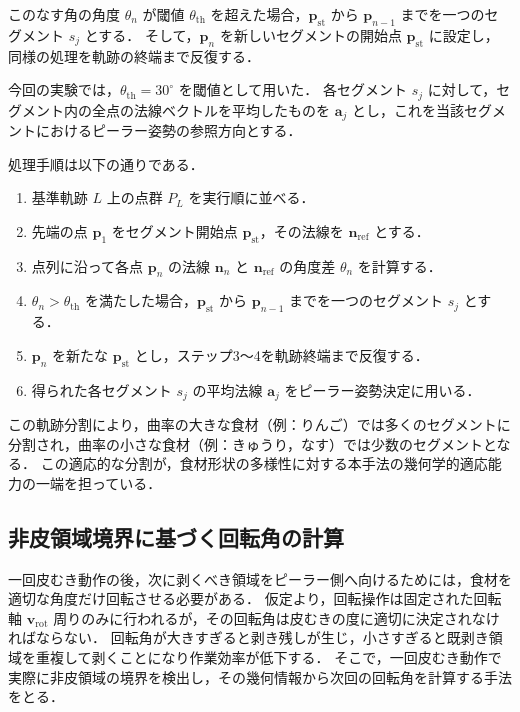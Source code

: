 
このなす角の角度 $\theta_n$ が閾値 $\theta_{\mathrm{th}}$ を超えた場合，$\mathbf{p}_{\mathrm{st}}$ から $\mathbf{p}_{n-1}$ までを一つのセグメント $s_j$ とする．
そして，$\mathbf{p}_n$ を新しいセグメントの開始点 $\mathbf{p}_{\mathrm{st}}$ に設定し，同様の処理を軌跡の終端まで反復する．

今回の実験では，$\theta_{\mathrm{th}} = 30^\circ$ を閾値として用いた．
各セグメント $s_j$ に対して，セグメント内の全点の法線ベクトルを平均したものを $\mathbf{a}_j$ とし，これを当該セグメントにおけるピーラー姿勢の参照方向とする．

処理手順は以下の通りである．

\begin{enumerate}
  \item 基準軌跡 $L$ 上の点群 $P_L$ を実行順に並べる．
  \item 先端の点 $\mathbf{p}_1$ をセグメント開始点 $\mathbf{p}_{\mathrm{st}}$，その法線を $\mathbf{n}_{\mathrm{ref}}$ とする．
  \item 点列に沿って各点 $\mathbf{p}_n$ の法線 $\mathbf{n}_n$ と $\mathbf{n}_{\mathrm{ref}}$ の角度差 $\theta_n$ を計算する．
  \item $\theta_n > \theta_{\mathrm{th}}$ を満たした場合，$\mathbf{p}_{\mathrm{st}}$ から $\mathbf{p}_{n-1}$ までを一つのセグメント $s_j$ とする．
  \item $\mathbf{p}_n$ を新たな $\mathbf{p}_{\mathrm{st}}$ とし，ステップ3〜4を軌跡終端まで反復する．
  \item 得られた各セグメント $s_j$ の平均法線 $\mathbf{a}_j$ をピーラー姿勢決定に用いる．
\end{enumerate}

この軌跡分割により，曲率の大きな食材（例：りんご）では多くのセグメントに分割され，曲率の小さな食材（例：きゅうり，なす）では少数のセグメントとなる．
この適応的な分割が，食材形状の多様性に対する本手法の幾何学的適応能力の一端を担っている．

\subsection{非皮領域境界に基づく回転角の計算}
\label{sec:peeling_rotation_calc}

一回皮むき動作の後，次に剥くべき領域をピーラー側へ向けるためには，食材を適切な角度だけ回転させる必要がある．
仮定より，回転操作は固定された回転軸 $\mathbf{v}_{\mathrm{rot}}$ 周りのみに行われるが，その回転角は皮むきの度に適切に決定されなければならない．
回転角が大きすぎると剥き残しが生じ，小さすぎると既剥き領域を重複して剥くことになり作業効率が低下する．
そこで，一回皮むき動作で実際に非皮領域の境界を検出し，その幾何情報から次回の回転角を計算する手法をとる．

